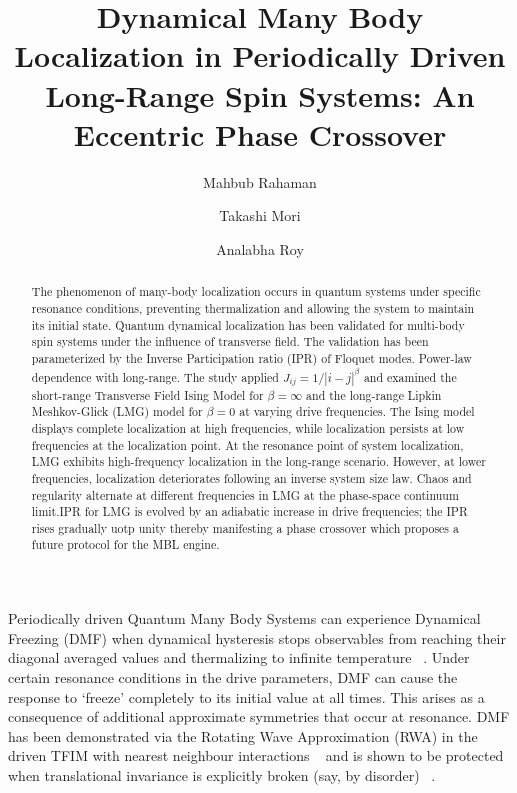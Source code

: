 \documentclass[%
reprint,
superscriptaddress,
amsmath,amssymb,
aps,
prb,
showkeys,
]{revtex4-2}
\begin{document}
	
	
	\title{Dynamical Many Body Localization in Periodically Driven Long-Range Spin Systems: An Eccentric Phase Crossover}%
	
	\author{Mahbub Rahaman}
	\author{Takashi Mori}
	\author{Analabha Roy}
	
	\begin{abstract}
		The phenomenon of many-body localization occurs in quantum systems under specific resonance conditions, preventing thermalization and allowing the system to maintain its initial state. Quantum dynamical localization has been validated for multi-body spin systems under the influence of transverse field. The validation has been parameterized by the Inverse Participation ratio (IPR) of Floquet modes. Power-law dependence with long-range. The study applied $J_{ij} = 1/|i-j|^{\beta}$ and examined the short-range Transverse Field Ising Model for $\beta = \infty$ and the long-range Lipkin Meshkov-Glick (LMG) model for $\beta = 0$ at varying drive frequencies. The Ising model displays complete localization at high frequencies, while localization persists at low frequencies at the localization point. At the resonance point of system localization, LMG exhibits high-frequency localization in the long-range scenario. However, at lower frequencies, localization deteriorates following an inverse system size law. Chaos and regularity alternate at different frequencies in LMG at the phase-space continuum limit.IPR for LMG is evolved by an adiabatic increase in drive frequencies; the IPR rises gradually uotp unity  thereby manifesting a phase crossover which proposes a future protocol for the MBL engine.
	\end{abstract}
	
	\maketitle
	
	Periodically driven Quantum Many Body Systems can experience Dynamical Freezing (DMF) when  dynamical hysteresis stops observables from reaching their diagonal averaged values and thermalizing to infinite temperature ~\cite{bordia_periodically_2017, sahoo_periodically_2019, das_exotic_2010}. Under certain resonance conditions in the drive parameters, DMF can cause the response to ‘freeze’ completely to its initial value at all times. This arises as a consequence of additional approximate symmetries that occur at resonance. DMF has been demonstrated via the Rotating Wave Approximation (RWA) in the driven TFIM with nearest neighbour interactions ~\cite{mbeng_quantum_2020} and is shown to be protected when translational invariance is explicitly broken (say, by disorder) ~\cite{yamada_localization_2022, roy_fate_2015}. 
\end{document}

